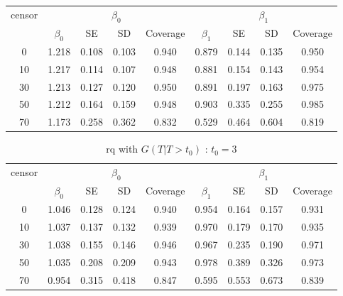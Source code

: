 \documentclass[12pt]{article}
\begin{document}
\begin{enumerate}
\begin{table}[hbt!]
			\centering
			\begin{tabular}{|c|c|c|c|c|c|c|c|c|}
				\hline
				\multirow{2}{*}{censor} & \multicolumn{4}{c|}{$\beta_0$} & \multicolumn{4}{c|}{$\beta_1$}\\ \cline{2-9}
				& $\beta_0$ & SE & SD  & Coverage  & $\beta_1$ & SE & SD & Coverage\\
				\hline\hline
				0 & 1.218 & 0.108 & 0.103 & 0.940 & 0.879 & 0.144 & 0.135 & 0.950 \\ 
  10 & 1.217 & 0.114 & 0.107 & 0.948 & 0.881 & 0.154 & 0.143 & 0.954 \\ 
  30 & 1.213 & 0.127 & 0.120 & 0.950 & 0.891 & 0.197 & 0.163 & 0.975 \\ 
  50 & 1.212 & 0.164 & 0.159 & 0.948 & 0.903 & 0.335 & 0.255 & 0.985 \\ 
  70 & 1.173 & 0.258 & 0.362 & 0.832 & 0.529 & 0.464 & 0.604 & 0.819 \\ 
				\hline
			\end{tabular}
		\end{table}
		\begin{table}[hbt!]
			\caption{rq with $G(T|T>t_0)$ : $t_0=3$}
			\centering
			\begin{tabular}{|c|c|c|c|c|c|c|c|c|}
				\hline
				\multirow{2}{*}{censor} & \multicolumn{4}{c|}{$\beta_0$} & \multicolumn{4}{c|}{$\beta_1$}\\ \cline{2-9}
				& $\beta_0$ & SE & SD  & Coverage  & $\beta_1$ & SE & SD & Coverage\\
				\hline\hline
				0 & 1.046 & 0.128 & 0.124 & 0.940 & 0.954 & 0.164 & 0.157 & 0.931 \\ 
  10 & 1.037 & 0.137 & 0.132 & 0.939 & 0.970 & 0.179 & 0.170 & 0.935 \\ 
  30 & 1.038 & 0.155 & 0.146 & 0.946 & 0.967 & 0.235 & 0.190 & 0.971 \\ 
  50 & 1.035 & 0.208 & 0.209 & 0.943 & 0.978 & 0.389 & 0.326 & 0.973 \\ 
  70 & 0.954 & 0.315 & 0.418 & 0.847 & 0.595 & 0.553 & 0.673 & 0.839 \\ 
				\hline
			\end{tabular}
		\end{table}
\end{enumerate}
\end{document}
